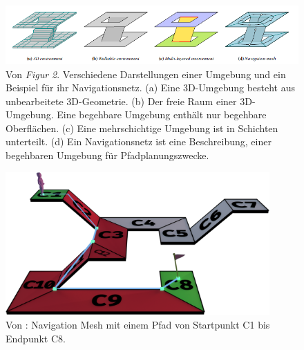 \begin{figure}[H] %
	\centering
	\includegraphics[width=\textwidth]{images/navigation_mesh_16.png}
	\caption{Von \cite[~S. 93]{Mesh:16} \textit{Figur 2}. Verschiedene Darstellungen einer Umgebung und ein Beispiel für ihr Navigationsnetz. (a) Eine 3D-Umgebung besteht aus unbearbeitete 3D-Geometrie. (b) Der freie Raum einer 3D-Umgebung. Eine begehbare Umgebung enthält nur begehbare Oberflächen. (c) Eine mehrschichtige Umgebung ist in Schichten unterteilt. (d) Ein Navigationsnetz ist eine Beschreibung, einer begehbaren Umgebung für Pfadplanungszwecke.}
	\label{sec1a}
\end{figure}
\begin{figure}[H] %
	\centering
	\includegraphics[width=0.9\textwidth]{images/mesh_with_path.png}
	\caption{Von \cite{Mesh:18}: Navigation Mesh mit einem Pfad von Startpunkt C1 bis Endpunkt C8.}
	\label{sec1b}
\end{figure}


